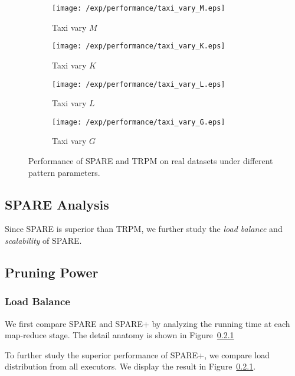 \begin{figure*}[t]
    \begin{subfigure}[b]{0.23\textwidth}
        \texttt{[image: /exp/performance/taxi\_vary\_M.eps]}
        \caption{Taxi vary $M$}
    \end{subfigure}
    \begin{subfigure}[b]{0.23\textwidth}
        \texttt{[image: /exp/performance/taxi\_vary\_K.eps]}
        \caption{Taxi vary $K$}
    \end{subfigure}
    \begin{subfigure}[b]{0.23\textwidth}
        \texttt{[image: /exp/performance/taxi\_vary\_L.eps]}
        \caption{Taxi vary $L$}
    \end{subfigure}
       \begin{subfigure}[b]{0.23\textwidth}
        \texttt{[image: /exp/performance/taxi\_vary\_G.eps]}
        \caption{Taxi vary $G$}
    \end{subfigure}       
\caption{Performance of SPARE and TRPM on real datasets under different pattern parameters.}
\label{exp:performance_vary}
\end{figure*}




\subsection{SPARE Analysis}
Since SPARE is superior than TRPM, we further study the \emph{load balance} and \emph{scalability} of SPARE.

\subsection{Pruning Power}

\subsubsection{Load Balance}
We first compare SPARE and SPARE+ by analyzing the running time at
each map-reduce stage. The detail anatomy is shown in Figure~\ref{}


To further study the superior performance of SPARE+, we compare load distribution from all executors. We display the result in Figure~\ref{}.


